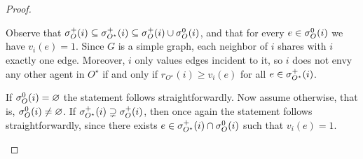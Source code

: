 \begin{proof}
    \begin{nestedproof}
        Observe that $\sigma^+_O(i) \subseteq \sigma^+_{O^\star}(i) \subseteq \sigma^+_O(i) \cup \sigma^0_O(i)$,
        and that for every $e \in \sigma^0_O(i)$ we have $v_i(e) = 1$.
        Since $G$ is a simple graph, each neighbor of $i$ shares with $i$ exactly one edge.
        Moreover, $i$ only values edges incident to it, so $i$ does not envy any other agent in $O^\star$
        if and only if $r_{O^\star}(i) \ge v_i(e)$ for all $e \in \sigma^+_{O^\star}(i)$.

        If $\sigma^0_O(i) = \varnothing$ the statement follows straightforwardly.
        Now assume otherwise, that is, $\sigma^0_O(i) \neq \varnothing$.
        If $\sigma^+_{O^\star}(i) \supsetneq \sigma^+_O(i)$, then once again the statement follows
        straightforwardly, since there exists $e \in \sigma^+_{O^\star}(i) \cap \sigma^0_O(i)$ such that $v_i(e) = 1$.


\end{nestedproof}
\end{proof}
